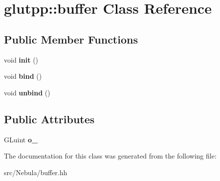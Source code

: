\hypertarget{classglutpp_1_1buffer}{\section{glutpp\-:\-:buffer \-Class \-Reference}
\label{classglutpp_1_1buffer}
}
\subsection*{\-Public \-Member \-Functions}
\begin{DoxyCompactItemize}
\item 
\hypertarget{classglutpp_1_1buffer_a557629990348485f76e992293cfdb636}{void {\bfseries init} ()}\label{classglutpp_1_1buffer_a557629990348485f76e992293cfdb636}

\item 
\hypertarget{classglutpp_1_1buffer_a37d4b5aac0052a9724b94784205945e7}{void {\bfseries bind} ()}\label{classglutpp_1_1buffer_a37d4b5aac0052a9724b94784205945e7}

\item 
\hypertarget{classglutpp_1_1buffer_af93df84319c7d459b77c4c0c5e515119}{void {\bfseries unbind} ()}\label{classglutpp_1_1buffer_af93df84319c7d459b77c4c0c5e515119}

\end{DoxyCompactItemize}
\subsection*{\-Public \-Attributes}
\begin{DoxyCompactItemize}
\item 
\hypertarget{classglutpp_1_1buffer_a45bc4e78c108b155f79e81901b7faba1}{\-G\-Luint {\bfseries o\-\_\-}}\label{classglutpp_1_1buffer_a45bc4e78c108b155f79e81901b7faba1}

\end{DoxyCompactItemize}


\-The documentation for this class was generated from the following file\-:\begin{DoxyCompactItemize}
\item 
src/\-Nebula/buffer.\-hh\end{DoxyCompactItemize}
